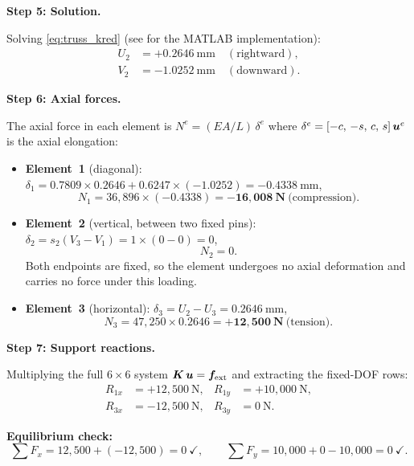 \begin{example}
\medskip
\noindent\textbf{Step 5: Solution.}

Solving \cref{eq:truss_kred} (see  for the MATLAB
implementation):
\begin{align*}
    U_2 &= +0.2646\ \text{mm} \quad (\text{rightward}), \\
    V_2 &= -1.0252\ \text{mm} \quad (\text{downward}).
\end{align*}

\medskip
\noindent\textbf{Step 6: Axial forces.}

The axial force in each element is $N^e = (EA/L)\,\delta^e$ where
$\delta^e = [-c,\,-s,\,c,\,s]\,\bm{u}^e$ is the axial elongation:

\begin{itemize}
    \item \textbf{Element~1} (diagonal): $\delta_1 = 0.7809 \times 0.2646
          + 0.6247 \times (-1.0252) = -0.4338\ \text{mm}$,
          \[N_1 = 36{,}896 \times (-0.4338) = \mathbf{-16{,}008\ \text{N}}\
          \text{(compression)}.\]

    \item \textbf{Element~2} (vertical, between two fixed pins):
          $\delta_2 = s_2(V_3 - V_1) = 1 \times (0-0) = 0$,
          \[N_2 = 0.\]
          Both endpoints are fixed, so the element undergoes no axial
          deformation and carries no force under this loading.

    \item \textbf{Element~3} (horizontal): $\delta_3 = U_2 - U_3 =
          0.2646\ \text{mm}$,
          \[N_3 = 47{,}250 \times 0.2646 = \mathbf{+12{,}500\ \text{N}}\
          \text{(tension)}.\]
\end{itemize}

\medskip
\noindent\textbf{Step 7: Support reactions.}

Multiplying the full $6\times6$ system $\bm{K}\,\bm{u} = \bm{f}_{\text{ext}}$
and extracting the fixed-DOF rows:
\begin{align*}
    R_{1x} &= +12{,}500\ \text{N}, &  R_{1y} &= +10{,}000\ \text{N}, \\
    R_{3x} &= -12{,}500\ \text{N}, &  R_{3y} &= 0\ \text{N}.
\end{align*}

\noindent\textbf{Equilibrium check:}
\[
    \textstyle\sum F_x = 12{,}500 + (-12{,}500) = 0\ \checkmark, \qquad
    \textstyle\sum F_y = 10{,}000 + 0 - 10{,}000 = 0\ \checkmark .
\]

\end{example}
